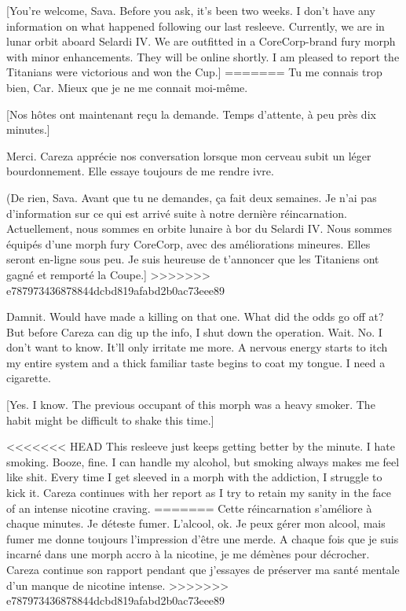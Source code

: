 [You're welcome, Sava. Before you ask, it's been two weeks. I don't have any information on what happened following our last resleeve. Currently, we are in lunar orbit aboard Selardi IV. We are outfitted in a CoreCorp-brand fury morph with minor enhancements. They will be online shortly. I am pleased to report the Titanians were victorious and won the Cup.] 
=======
Tu me connais trop bien, Car. Mieux que je ne me connait moi-même. 

[Nos hôtes ont maintenant reçu la demande. Temps d'attente, à peu près dix minutes.] 

Merci. Careza apprécie nos conversation lorsque mon cerveau subit un léger bourdonnement. Elle essaye toujours de me rendre ivre. 

(De rien, Sava. Avant que tu ne demandes, ça fait deux semaines. Je n'ai pas d'information sur ce qui est arrivé suite à notre dernière réincarnation. Actuellement, nous sommes en orbite lunaire à bor du Selardi IV. Nous sommes équipés d'une morph fury CoreCorp, avec des améliorations mineures. Elles seront en-ligne sous peu. Je suis heureuse de t'annoncer que les Titaniens ont gagné et remporté la Coupe.] 
>>>>>>> e787973436878844dcbd819afabd2b0ac73eee89

Damnit. Would have made a killing on that one. What did the odds go off at? But before Careza can dig up the info, I shut down the operation. Wait. No. I don't want to know. It'll only irritate me more. A nervous energy starts to itch my entire system and a thick familiar taste begins to coat my tongue. I need a cigarette. 

[Yes. I know. The previous occupant of this morph was a heavy smoker. The habit might be difficult to shake this time.] 

<<<<<<< HEAD
This resleeve just keeps getting better by the minute. I hate smoking. Booze, fine. I can handle my alcohol, but smoking always makes me feel like shit. Every time I get sleeved in a morph with the addiction, I struggle to kick it. Careza continues with her report as I try to retain my sanity in the face of an intense nicotine craving. 
=======
Cette réincarnation s'améliore à chaque minutes. Je déteste fumer. L'alcool, ok. Je peux gérer mon alcool, mais fumer me donne toujours l'impression d'être une merde. A chaque fois que je suis incarné dans une morph accro à la nicotine, je me démènes pour décrocher. Careza continue son rapport pendant que j'essayes de préserver ma santé mentale d'un manque de nicotine intense. 
>>>>>>> e787973436878844dcbd819afabd2b0ac73eee89

